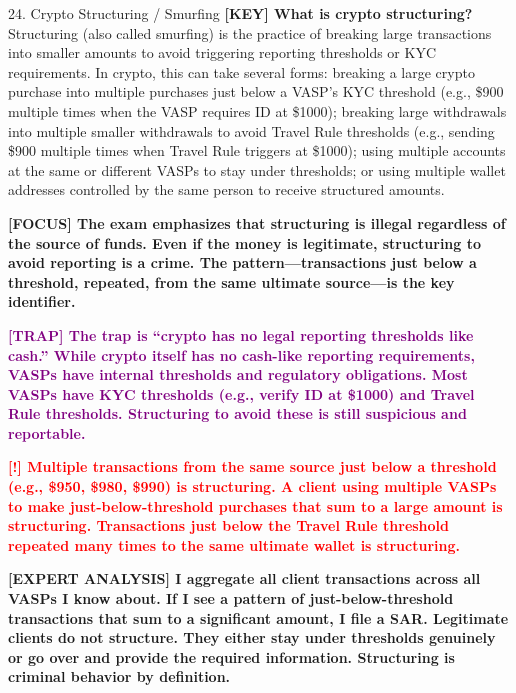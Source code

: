 \documentclass[11pt,a4paper]{beamer}
\newcommand{\redflag}[1]{\textcolor{red}{\textbf{[!] #1}}}
\newcommand{\examfocus}[1]{\textcolor{orange!80!black}{\textbf{[FOCUS] #1}}}
\newcommand{\trap}[1]{\textcolor{purple}{\textbf{[TRAP] #1}}}
\newcommand{\keyterm}[1]{\textcolor{red!80!black}{\textbf{[KEY] #1}}}
\newcommand{\expert}[1]{\textcolor{blue!70!black}{\textbf{[EXPERT ANALYSIS] #1}}}
\begin{document}
	\begin{frame}{24. Crypto Structuring / Smurfing}
		\tiny
		\keyterm{What is crypto structuring?} Structuring (also called smurfing) is the practice of breaking large transactions into smaller amounts to avoid triggering reporting thresholds or KYC requirements. In crypto, this can take several forms: breaking a large crypto purchase into multiple purchases just below a VASP's KYC threshold (e.g., \$900 multiple times when the VASP requires ID at \$1000); breaking large withdrawals into multiple smaller withdrawals to avoid Travel Rule thresholds (e.g., sending \$900 multiple times when Travel Rule triggers at \$1000); using multiple accounts at the same or different VASPs to stay under thresholds; or using multiple wallet addresses controlled by the same person to receive structured amounts.
		
		\vspace{0.1cm}
		\examfocus{The exam emphasizes that structuring is illegal regardless of the source of funds. Even if the money is legitimate, structuring to avoid reporting is a crime. The pattern—transactions just below a threshold, repeated, from the same ultimate source—is the key identifier.}
		
		\vspace{0.1cm}
		\trap{The trap is “crypto has no legal reporting thresholds like cash.” While crypto itself has no cash-like reporting requirements, VASPs have internal thresholds and regulatory obligations. Most VASPs have KYC thresholds (e.g., verify ID at \$1000) and Travel Rule thresholds. Structuring to avoid these is still suspicious and reportable.}
		
		\vspace{0.1cm}
		\redflag{Multiple transactions from the same source just below a threshold (e.g., \$950, \$980, \$990) is structuring. A client using multiple VASPs to make just-below-threshold purchases that sum to a large amount is structuring. Transactions just below the Travel Rule threshold repeated many times to the same ultimate wallet is structuring.}
		
		\vspace{0.1cm}
		\expert{I aggregate all client transactions across all VASPs I know about. If I see a pattern of just-below-threshold transactions that sum to a significant amount, I file a SAR. Legitimate clients do not structure. They either stay under thresholds genuinely or go over and provide the required information. Structuring is criminal behavior by definition.}
	\end{frame}
	
\end{document}
